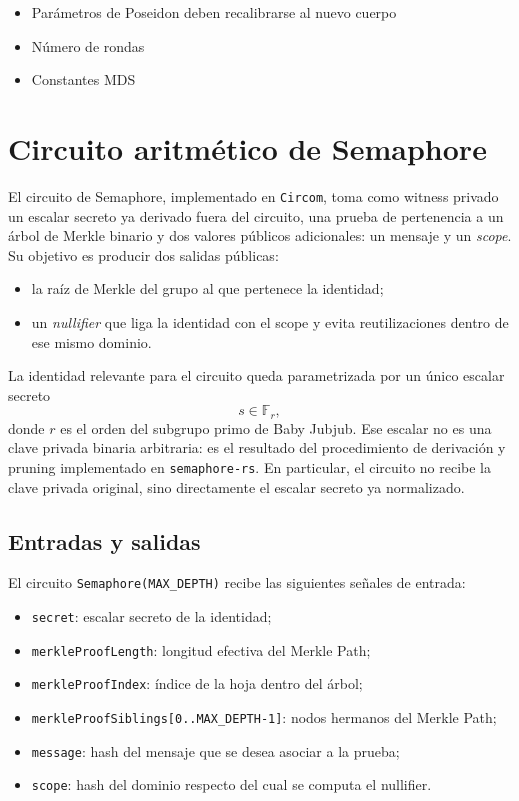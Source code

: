 \documentclass[11pt,a4paper]{article}
\begin{document}
	\begin{itemize}
		\item Parámetros de Poseidon deben recalibrarse al nuevo cuerpo
		\item Número de rondas
		\item Constantes MDS
	\end{itemize}
	
	\section{Circuito aritmético de Semaphore}
	
	El circuito de Semaphore, implementado en \texttt{Circom}, toma como witness privado un escalar secreto ya derivado fuera del circuito, una prueba de pertenencia a un árbol de Merkle binario y dos valores públicos adicionales: un mensaje y un \emph{scope}. Su objetivo es producir dos salidas públicas:
	\begin{itemize}
		\item la raíz de Merkle del grupo al que pertenece la identidad;
		\item un \emph{nullifier} que liga la identidad con el scope y evita reutilizaciones dentro de ese mismo dominio.
	\end{itemize}
	
	La identidad relevante para el circuito queda parametrizada por un único escalar secreto
	\[
	s \in \mathbb{F}_r,
	\]
	donde \(r\) es el orden del subgrupo primo de Baby Jubjub. Ese escalar no es una clave privada binaria arbitraria: es el resultado del procedimiento de derivación y pruning implementado en \texttt{semaphore-rs}. En particular, el circuito no recibe la clave privada original, sino directamente el escalar secreto ya normalizado.
	
	\subsection{Entradas y salidas}
	
	El circuito \texttt{Semaphore(MAX\_DEPTH)} recibe las siguientes señales de entrada:
	\begin{itemize}
		\item \texttt{secret}: escalar secreto de la identidad;
		\item \texttt{merkleProofLength}: longitud efectiva del Merkle Path;
		\item \texttt{merkleProofIndex}: índice de la hoja dentro del árbol;
		\item \texttt{merkleProofSiblings[0..MAX\_DEPTH-1]}: nodos hermanos del Merkle Path;
		\item \texttt{message}: hash del mensaje que se desea asociar a la prueba;
		\item \texttt{scope}: hash del dominio respecto del cual se computa el nullifier.
	\end{itemize}
	
\end{document}

